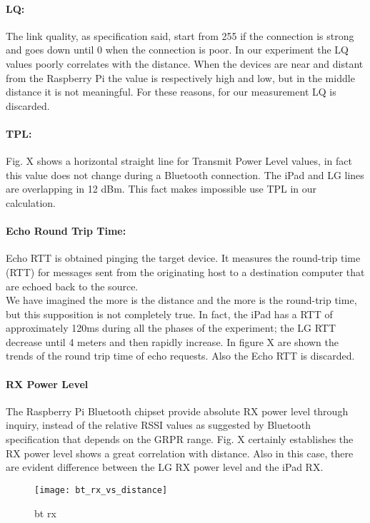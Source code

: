 \paragraph{LQ:} The link quality, as specification said, start from 255 if the connection is strong and goes down until 0 when the connection is poor. In our experiment the LQ values poorly correlates with the distance. When the devices are near and distant from the Raspberry Pi the value is respectively high and low, but in the middle distance it is not meaningful. For these reasons, for our measurement LQ is discarded.
\paragraph{TPL:} 
Fig. X shows a horizontal straight line for Transmit Power Level values, in fact this value does not change during a Bluetooth connection. The iPad and LG lines are overlapping in 12 dBm. This fact makes impossible use TPL in our calculation.
\paragraph{Echo Round Trip Time:} Echo RTT is obtained pinging the target device. It measures the round-trip time (RTT) for messages sent from the originating host to a destination computer that are echoed back to the source.\\
We have imagined the more is the distance and the more is the round-trip time, but this supposition is not completely true. In fact, the iPad has a RTT of approximately 120ms during all the phases of the experiment; the LG RTT decrease until 4 meters and then rapidly increase. In figure X are shown the trends of the round trip time of echo requests. Also the Echo RTT is discarded.
\paragraph{RX Power Level}
The Raspberry Pi Bluetooth chipset provide absolute RX power level through inquiry, instead of the relative RSSI values as suggested by Bluetooth specification that depends on the GRPR range. Fig. X certainly establishes the RX power level shows a great correlation with distance. Also in this case, there are evident difference between the LG RX power level and the iPad RX.

\begin{figure}[H]
\centering
\texttt{[image: bt\_rx\_vs\_distance]}
\caption{bt rx}
\end{figure}

